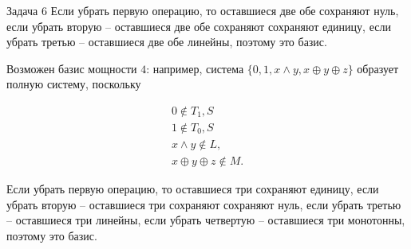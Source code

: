 \documentclass{article}
\begin{document}
\begin{section}{Задача 6}
		Если убрать первую операцию, то оставшиеся две обе сохраняют нуль, если убрать вторую -- оставшиеся две обе сохраняют сохраняют единицу, если убрать третью -- оставшиеся две обе линейны, поэтому это базис.

		Возможен базис мощности $4$: например, система $\{0, 1, x \land y, x \oplus y \oplus z\}$ образует полную систему, поскольку

		\begin{gather*}
			0 \not\in T_1, S \\
			1 \not\in T_0, S \\
			x \land y \not\in L, \\
			x \oplus y \oplus z \not\in M.
		\end{gather*}

		Если убрать первую операцию, то оставшиеся три сохраняют единицу, если убрать вторую -- оставшиеся три сохраняют сохраняют нуль, если убрать третью -- оставшиеся три линейны, если убрать четвертую -- оставшиеся три монотонны, поэтому это базис.
	\end{section}
\end{document}
